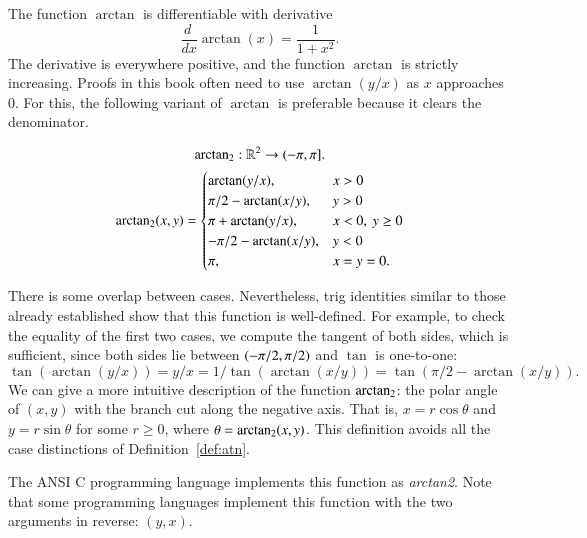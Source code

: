 The function $\arctan$ is differentiable with derivative%
\begin{equation}\label{eqn:deriv-tan}\frac{d\phantom{~}} {dx} \arctan(x) = \frac{1}{1 +
    x^2}.\end{equation}
The derivative is everywhere positive, and the function $\arctan$ is
strictly increasing.   
%
Proofs in this book often need to use $\arctan(y/x)$ as  $x$ approaches $0$.
For this, the following variant of $\arctan$ is preferable because it clears the denominator.


\begin{definition}[$\atn$]\label{def:atn}
\[ 
{\operatorname{arctan_2}}: \mathbb{R}^2 \to (-\pi,\pi].
\] 
\[ 
{\operatorname{arctan_2}}(x,y) = \begin{cases}
\arctan(y/x), & x > 0\\
\pi/2- \arctan(x/y), & y > 0 \\
\pi + \arctan(y/x), & x< 0,\  y\ge 0\\
-\pi/2- \arctan(x/y), & y< 0 \\
\pi, & x= y=0.\\
\end{cases}
\] 
\end{definition}
%
%
%
\figYOXQFUB %


There is some overlap between cases. Nevertheless, trig identities
similar to those already established show that this function is
well-defined.  For example, to check the equality of the first two
cases, we compute the tangent of both sides, which is sufficient,
since both sides lie between $(-\pi/2,\pi/2)$ and
$\tan$ is one-to-one:
\[ 
  \tan(\arctan(y/x)) = y/x = 
  1/\tan(\arctan(x/y)) = \tan(\pi/2 - \arctan(x/y)).
\] 
We can give a more intuitive description of
the function $\atn$:    the polar angle of $(x,y)$ with the
branch cut along the negative axis.  That is, $x = r\cos\theta$ and
$y=r\sin\theta$ for some $r\ge0$, where $\theta={\operatorname{arctan_2}}(x,y)$.  This definition avoids all
the case distinctions of Definition~\ref{def:atn}.

The ANSI C programming language implements this function as {\it
  arctan2}.  Note that some programming languages implement this
function with the two arguments in reverse: $(y,x)$.
%
%
%
%


